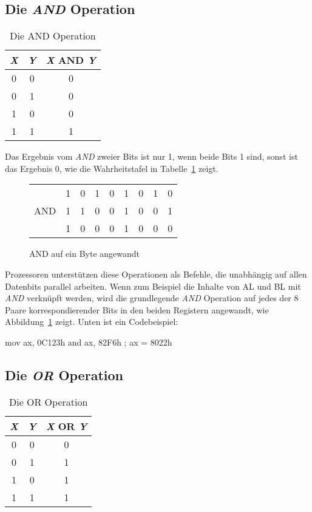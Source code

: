 \subsection{Die \emph{AND} Operation}
\begin{table}[ht]
\centering
\begin{tabular}{|c|c|c|}
 \hline
 \emph{X} & \emph{Y} & \emph{X} AND \emph{Y} \\
 \hline \hline
 0 & 0 & 0 \\
 0 & 1 & 0 \\
 1 & 0 & 0 \\
 1 & 1 & 1 \\
 \hline
\end{tabular}
\caption{Die AND Operation \label{tab:and}}
\end{table}

Das Ergebnis vom \emph{AND} zweier Bits ist nur 1, wenn beide Bits 1
sind, sonst ist das Ergebnis 0, wie die Wahrheitstafel in
Tabelle~\ref{tab:and} zeigt.

\begin{figure}[ht]
\centering
\begin{tabular}{rcccccccc}
     & 1 & 0 & 1 & 0 & 1 & 0 & 1 & 0 \\
 AND & 1 & 1 & 0 & 0 & 1 & 0 & 0 & 1 \\
 \hline
     & 1 & 0 & 0 & 0 & 1 & 0 & 0 & 0
\end{tabular}
\caption{AND auf ein Byte angewandt \label{fig:and}}
\end{figure}

Prozessoren unterst\"{u}tzen diese Operationen als Befehle, die
unabh\"{a}ngig auf allen Datenbits parallel arbeiten. Wenn zum Beispiel
die Inhalte von {\code AL} und {\code BL} mit \emph{AND} verkn\"{u}pft
werden, wird die grundlegende \emph{AND} Operation auf jedes der 8
Paare korrespondierender Bits in den beiden Registern angewandt, wie
Abbildung~\ref{fig:and} zeigt. Unten ist ein Codebeispiel:
\begin{AsmCodeListing}[frame=none, numbers=left]
      mov    ax, 0C123h
      and    ax, 82F6h        ; ax = 8022h
\end{AsmCodeListing}

\subsection{Die \emph{OR} Operation }

\begin{table}[ht]
\centering
\begin{tabular}{|c|c|c|}
 \hline
 \emph{X} & \emph{Y} & \emph{X} OR \emph{Y} \\
 \hline \hline
 0 & 0 & 0 \\
 0 & 1 & 1 \\
 1 & 0 & 1 \\
 1 & 1 & 1 \\
 \hline
\end{tabular}
\caption{Die OR Operation \label{tab:or}}
\end{table}


